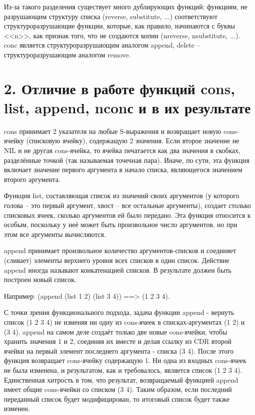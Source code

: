 \documentclass[12pt]{report}
\begin{document}
Из-за такого разделения существует много дублирующих функций: функциям, не разрушающим структуру списка (reverse, substitute, ...) соответствуют структуроразрушающие функции, которые, как правило, начинаются с буквы <<n>>, как признак того, что не создаются копии (nreverse, nsubstitute, ...). conc является структуроразрушающим аналогом append, delete -- структуроразрушающим аналогом remove.

\section*{2. Отличие в работе функций cons, list, append, nconс и в их результате}

cons принимает 2 указателя на любые S-выражения и возвращает новую cons-ячейку (списковую ячейку), содержащую 2 значения. Если второе значение не NIL и не другая cons-ячейка, то ячейка печатается как два значения в скобках, разделённые точкой (так называемая точечная пара). Иначе, по сути, эта функция включает значение первого аргумента в начало списка, являющегося значением второго аргумента. 

Функция list, составляющая список из значений своих аргументов (у которого голова -- это первый аргумент, хвост -- все остальные аргументы), создает столько списковых ячеек, сколько аргументов ей было передано. Эта функция относится к особым, поскольку у неё может быть произвольное число аргументов, но при этом все аргументы вычисляются.

append принимает произвольное количество аргументов-списков и соединяет (сливает)  элементы верхнего уровня всех списков в один список. Действие append иногда называют конкатенацией списков. В результате должен быть построен новый список.

Например: (append (list 1 2) (list 3 4)) ==> (1 2 3 4). 

С точки зрения функционального подхода, задача функции append - вернуть список (1 2 3 4) не изменяя ни одну из cons-ячеек в списках-аргументах (1 2) и (3 4). append на самом деле создаёт только две новые cons-ячейки, чтобы хранить значения 1 и 2, соединяя их вместе и делая ссылку из CDR второй ячейки на первый элемент последнего аргумента - списка (3 4). После этого функция возвращает cons-ячейку содержащую 1. Ни одна из входных cons-ячеек не была изменена, и результатом, как и требовалось, является список (1 2 3 4). Единственная хитрость в том, что результат, возвращаемый функцией append имеет общие cons-ячейки со списком (3 4). Таким образом, если последний переданный список будет модифицирован, то  итоговый список будет также изменен.
\end{document}
